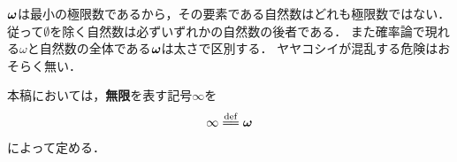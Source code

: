 	${\boldsymbol \omega}$は最小の極限数であるから，その要素である自然数はどれも極限数ではない．
	従って$\emptyset$を除く自然数は必ずいずれかの自然数の後者である．
	また確率論で現れる$\omega$と自然数の全体である${\boldsymbol \omega}$は太さで区別する．
	ヤヤコシイが混乱する危険はおそらく無い．

	\begin{screen}
		\begin{dfn}[無限]\label{def:infinity}
			本稿においては，{\bf 無限}を表す記号$\infty$を
			\begin{align}
				\infty \defeq \Natural
			\end{align}
			によって定める．
		\end{dfn}
	\end{screen}